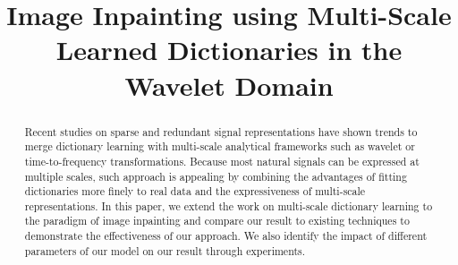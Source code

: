 \documentclass[conference]{IEEEtran}
\begin{document}
\title{Image Inpainting using Multi-Scale Learned Dictionaries in the Wavelet Domain}






% 
\author{
}



\maketitle

\begin{abstract}
Recent studies on sparse and redundant signal representations have shown trends to merge dictionary learning with multi-scale analytical frameworks such as wavelet or time-to-frequency transformations. Because most natural signals can be expressed at multiple scales, such approach is appealing by combining the advantages of fitting dictionaries more finely to real data and the expressiveness of multi-scale representations. In this paper, we extend the work \cite{multiscaleDictLearning} on multi-scale dictionary learning to the paradigm of image inpainting and compare our result to existing techniques to demonstrate the effectiveness of our approach. We also identify the impact of different parameters of our model on our result through experiments.
\end{abstract}
\end{document}
